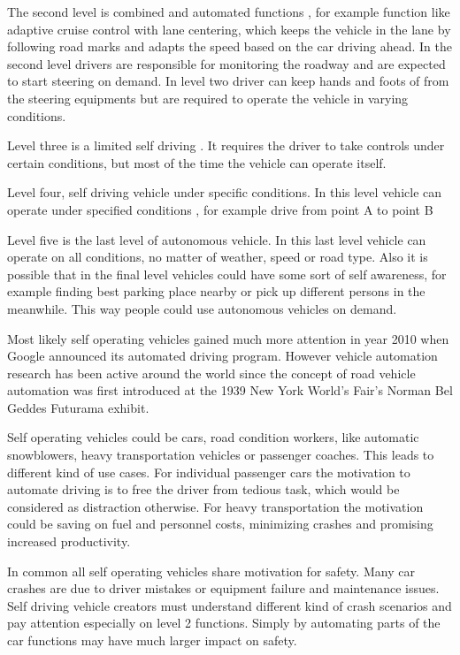 \documentclass[english]{tktltiki}
\begin{document}
The second level is combined and automated functions \cite{transportpolicy}, for example function like 
adaptive cruise control with lane centering, which keeps the vehicle in the lane 
by following road marks and adapts the speed based on the car driving ahead. In 
the second level drivers are responsible for monitoring the roadway and are 
expected to start steering on demand. In level two driver can keep hands and 
foots of from the steering equipments but are required to operate the vehicle in 
varying conditions.

Level three is a limited self driving \cite{transportpolicy}. It requires the driver to take controls 
under certain conditions, but most of the time the vehicle can operate itself. 

Level four, self driving vehicle under specific conditions. In this level 
vehicle can operate under specified conditions \cite{transportpolicy}, for example drive from point A 
to point B

Level five is the last level of autonomous vehicle. In this last level vehicle 
can operate on all conditions, no matter of weather, speed or road type. 
\cite{transportpolicy} Also it is possible that in the final level vehicles 
could have some sort of self awareness, for example finding best parking place 
nearby or pick up different persons in the meanwhile. This way people could use 
autonomous vehicles on demand.

Most likely self operating vehicles gained much more attention in year 2010 when 
Google announced its automated driving program. \cite{heavyvehicle} However vehicle automation 
research has been active around the world since the concept of road vehicle 
automation was first introduced at the 1939 New York World's Fair's Norman Bel 
Geddes Futurama exhibit.

Self operating vehicles could be cars, road condition workers, like automatic 
snowblowers, heavy transportation vehicles or passenger coaches. This leads to 
different kind of use cases. For individual passenger cars the motivation to 
automate driving is to free the driver from tedious task, \cite{heavyvehicle} which would be 
considered as distraction otherwise. For heavy transportation the motivation 
could be saving on fuel and personnel costs, minimizing crashes and promising 
increased productivity.

In common all self operating vehicles share motivation for safety. \cite{heavyvehicle} Many car 
crashes are due to driver mistakes or equipment failure and maintenance issues. 
Self driving vehicle creators must understand different kind of crash scenarios 
and pay attention especially on level 2 functions. Simply by automating parts of 
the car functions may have much larger impact on safety.
\end{document}

